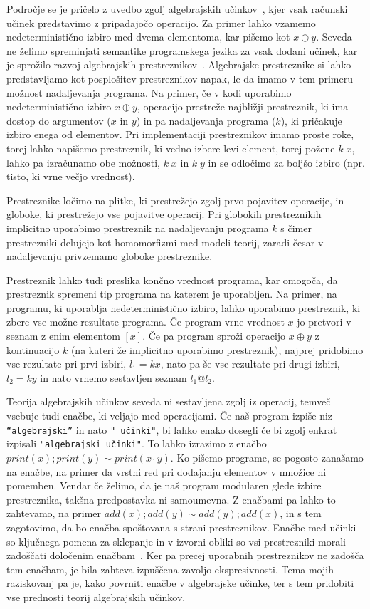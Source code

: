 \documentclass{article}
\begin{document}
Področje se je pričelo z uvedbo zgolj algebrajskih učinkov~\cite{DBLP:conf/fossacs/PlotkinP01, DBLP:journals/acs/PlotkinP03}, kjer vsak računski učinek predstavimo z pripadajočo operacijo. Za primer lahko vzamemo nedeterministično izbiro med dvema elementoma, kar pišemo kot $x \oplus y$. Seveda ne želimo spreminjati semantike programskega jezika za vsak dodani učinek, kar je sprožilo razvoj algebrajskih prestreznikov~\cite{DBLP:phd/ethos/Pretnar10}. Algebrajske prestreznike si lahko predstavljamo kot posplošitev prestreznikov napak, le da imamo v tem primeru možnost nadaljevanja programa. Na primer, če v kodi uporabimo nedeterministično izbiro $x \oplus y$, operacijo prestreže najbližji prestreznik, ki ima dostop do argumentov ($x$ in $y$) in pa nadaljevanja programa ($k$), ki pričakuje izbiro enega od elementov. Pri implementaciji prestreznikov imamo proste roke, torej lahko napišemo prestreznik, ki vedno izbere levi element, torej požene $k\; x$, lahko pa izračunamo obe možnosti, $k\; x$ in $k\; y$ in se odločimo za boljšo izbiro (npr. tisto, ki vrne večjo vrednost). 

Prestreznike ločimo na plitke, ki prestrežejo zgolj prvo pojavitev operacije, in globoke, ki prestrežejo vse pojavitve operacij. Pri globokih prestreznikih implicitno uporabimo prestreznik na nadaljevanju programa $k$ s čimer prestrezniki delujejo kot homomorfizmi med modeli teorij, zaradi česar v nadaljevanju privzemamo globoke prestreznike.

Prestreznik lahko tudi preslika končno vrednost programa, kar omogoča, da prestreznik spremeni tip programa na katerem je uporabljen. Na primer, na programu, ki uporablja nedeterministično izbiro, lahko uporabimo prestreznik, ki zbere vse možne rezultate programa. Če program vrne vrednost $x$ jo pretvori v seznam z enim elementom $[x]$. Če pa program sproži operacijo $x \oplus y$ z kontinuacijo $k$ (na kateri že implicitno uporabimo prestreznik), najprej pridobimo vse rezultate pri prvi izbiri, $l_1 = k x$, nato pa še vse rezultate pri drugi izbiri, $l_2 = k y$ in nato vrnemo sestavljen seznam $l_1 @ l_2$. 

Teorija algebrajskih učinkov seveda ni sestavljena zgolj iz operacij, temveč vsebuje tudi enačbe, ki veljajo med operacijami. Če naš program izpiše niz \texttt{``algebrajski''} in nato \texttt{" učinki"}, bi lahko enako dosegli če bi zgolj enkrat izpisali \texttt{"algebrajski učinki"}. To lahko izrazimo z enačbo $print(x); print(y) \sim print(x\;\hat{}\;y)$. Ko pišemo programe, se pogosto zanašamo na enačbe, na primer da vrstni red pri dodajanju elementov v množice ni pomemben. Vendar če želimo, da je naš program modularen glede izbire prestreznika, takšna predpostavka ni samoumevna. Z enačbami pa lahko to zahtevamo, na primer $add(x); add(y) \sim add(y); add(x)$, in s tem zagotovimo, da bo enačba spoštovana s strani prestreznikov. Enačbe med učinki so ključnega pomena za sklepanje in v izvorni obliki so vsi prestrezniki morali zadoščati določenim enačbam~\cite{DBLP:conf/esop/PlotkinP09}. Ker pa precej uporabnih prestreznikov ne zadošča tem enačbam, je bila zahteva izpuščena zavoljo ekspresivnosti. Tema mojih raziskovanj pa je, kako povrniti enačbe v algebrajske učinke, ter s tem pridobiti vse prednosti teorij algebrajskih učinkov.
\end{document}
